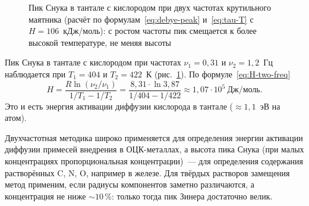 \begin{figure}[ht]
\centering
{}
\caption{Пик Снука в тантале с кислородом при двух частотах крутильного
маятника (расчёт по формулам~\eqref{eq:debye-peak} и~\eqref{eq:tau-T} с
$H=106$~кДж/моль): с ростом частоты пик смещается к более высокой
температуре, не меняя высоты}
\label{fig:snoek}
\end{figure}

\begin{primer}
Пик Снука в тантале с кислородом при частотах $\nu_1=0{,}31$ и $\nu_2=1{,}2$~Гц
наблюдается при $T_1=404$ и $T_2=422$~К (рис.~\ref{fig:snoek}). По
формуле~\eqref{eq:H-two-freq}
\[
H=\frac{R\ln(\nu_2/\nu_1)}{1/T_1-1/T_2}=\frac{8{,}31\cdot\ln3{,}87}{1/404-1/422}\approx1{,}07\cdot10^{5}~\text{Дж/моль}.
\]
Это и есть энергия активации диффузии кислорода в тантале
(${\approx}1{,}1$~эВ на атом)\isprmark.
\end{primer}

Двухчастотная методика широко применяется для определения энергии
активации диффузии примесей внедрения в ОЦК-металлах, а высота пика
Снука (при малых концентрациях пропорциональная концентрации)~— для
определения содержания растворённых C, N, O, например в железе. Для
твёрдых растворов замещения метод применим, если радиусы компонентов
заметно различаются, а концентрация не ниже ${\sim}10$\,\%: только тогда пик
Зинера достаточно велик.

